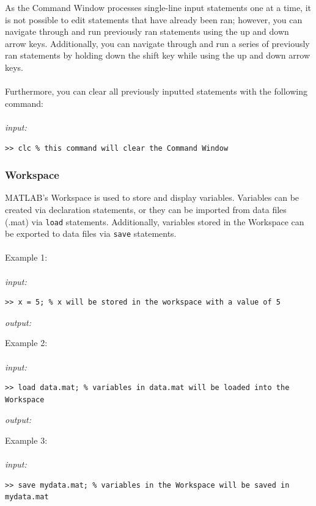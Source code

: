\documentclass[../MATLAB_Primer.tex]{subfiles}
\begin{document}
As the Command Window processes single-line input statements one at a time, it is not possible to edit statements that have already been ran; however, you can navigate through and run previously ran statements using the up and down arrow keys. Additionally, you can navigate through and run a series of previously ran statements by holding down the shift key while using the up and down arrow keys.
\\ \\
Furthermore, you can clear all previously inputted statements with the following command:
\\ \\
\textit{input:}
\begin{lstlisting}[frame=single]
>> clc % this command will clear the Command Window
\end{lstlisting}

\begin{center}
    
\end{center}

\subsubsection{Workspace}
MATLAB's Workspace is used to store and display variables. Variables can be created via declaration statements, or they can be imported from data files (.mat) via \texttt{load} statements. Additionally, variables stored in the Workspace can be exported to data files via \texttt{save} statements.
\\ \\
Example 1:
\\ \\
\textit{input:}
\begin{lstlisting}[frame=single]
>> x = 5; % x will be stored in the workspace with a value of 5
\end{lstlisting}

\textit{output:}

\begin{center}
    
\end{center}
Example 2:
\\ \\
\textit{input:}
\begin{lstlisting}[frame=single]
>> load data.mat; % variables in data.mat will be loaded into the Workspace
\end{lstlisting}
\textit{output:}

\begin{center}
    
\end{center}
Example 3:
\\ \\
\textit{input:}
\begin{lstlisting}[frame=single]
>> save mydata.mat; % variables in the Workspace will be saved in mydata.mat
\end{lstlisting}
\end{document}
